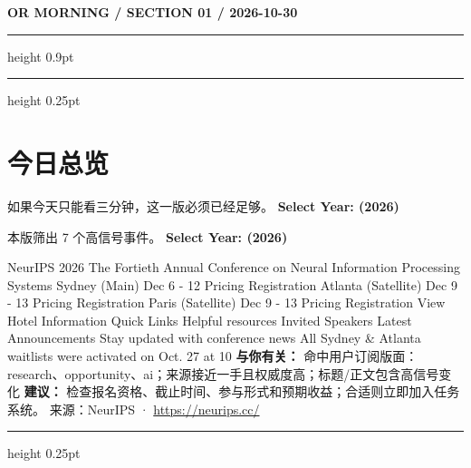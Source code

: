 \documentclass[10.5pt]{ctexart}
\begin{document}
{\small\bfseries OR MORNING / SECTION 01 / 2026-10-30}
\vspace{2mm}
\hrule height 0.9pt
\vspace{1.5mm}
\hrule height 0.25pt
\vspace{4mm}
\section*{今日总览}
{\color{ormuted} 如果今天只能看三分钟，这一版必须已经足够。}
\vspace{2mm}
{\fontsize{25}{29}\selectfont\bfseries Select Year: (2026)}\par
\vspace{2mm}
{\large 本版筛出 7 个高信号事件。}
\vspace{3mm}
{\Large\bfseries Select Year: (2026)}\par
NeurIPS 2026 The Fortieth Annual Conference on Neural Information Processing Systems Sydney (Main) Dec 6 - 12 Pricing Registration Atlanta (Satellite) Dec 9 - 13 Pricing Registration Paris (Satellite) Dec 9 - 13 Pricing Registration View Hotel Information Quick Links Helpful resources Invited Speakers Latest Announcements Stay updated with conference news All Sydney \& Atlanta waitlists were activated on Oct. 27 at 10
\textbf{与你有关：} 命中用户订阅版面：research、opportunity、ai；来源接近一手且权威度高；标题/正文包含高信号变化
\textbf{建议：} 检查报名资格、截止时间、参与形式和预期收益；合适则立即加入任务系统。
{\footnotesize\color{ormuted} 来源：NeurIPS · \url{https://neurips.cc/}}
\vspace{3mm}
\hrule height 0.25pt
\vspace{3mm}
\end{document}
